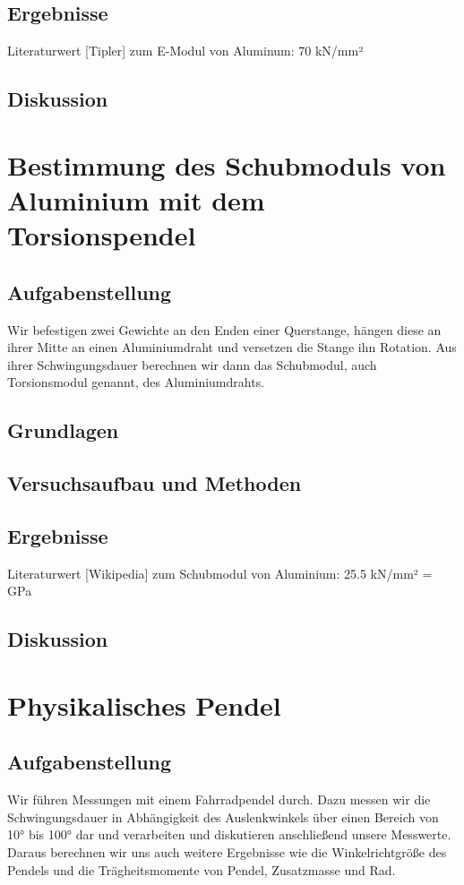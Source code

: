 \documentclass{article}
\begin{document}
\subsection{Ergebnisse}
Literaturwert [Tipler] zum E-Modul von Aluminum: 70 kN/mm²
\subsection{Diskussion}
\section{Bestimmung des Schubmoduls von Aluminium mit dem Torsionspendel}
\subsection{Aufgabenstellung}
Wir befestigen zwei Gewichte an den Enden einer Querstange, hängen diese an ihrer Mitte an einen Aluminiumdraht und versetzen die Stange ihn Rotation. Aus ihrer Schwingungsdauer berechnen wir dann das Schubmodul, auch Torsionsmodul genannt, des Aluminiumdrahts.
\subsection{Grundlagen}

\subsection{Versuchsaufbau und Methoden}
\subsection{Ergebnisse}
Literaturwert [Wikipedia] zum Schubmodul von Aluminium: 25.5 kN/mm² = GPa
\subsection{Diskussion}
\section{Physikalisches Pendel}
\subsection{Aufgabenstellung}
Wir führen Messungen mit einem Fahrradpendel durch. Dazu messen wir die Schwingungsdauer in Abhängigkeit des Auslenkwinkels über einen Bereich von 10° bis 100° dar und verarbeiten und diskutieren anschließend unsere Messwerte. 
Daraus berechnen wir uns auch weitere Ergebnisse wie die Winkelrichtgröße des Pendels und die Trägheitsmomente von Pendel, Zusatzmasse und Rad. 
\end{document}
